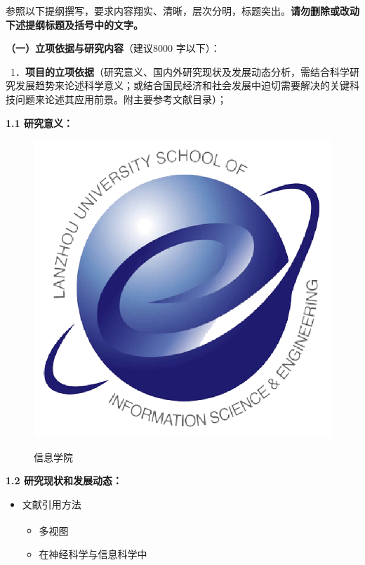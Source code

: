 \documentclass[UTF8,A4]{ctexart}
\newcommand{\upcite}[1]{\textsuperscript{\cite{#1}}}
\newcommand{\blue}{\textcolor[rgb]{0.00,0.44,0.75}}
\begin{document}
\pagestyle{empty}
\begin{center}
\end{center}
\begin{spacing}{1.6}
\kaishu
参照以下提纲撰写，要求内容翔实、清晰，层次分明，标题突出。\blue{\textbf{请勿删除或改动下述提纲标题及括号中的文字。}}

\blue{\textbf{（一）立项依据与研究内容}（建议8000 字以下）：}

\blue{~1．\textbf{项目的立项依据}（研究意义、国内外研究现状及发展动态分析，需结合科学研究发展趋势来论述科学意义；或结合国民经济和社会发展中迫切需要解决的关键科技问题来论述其应用前景。附主要参考文献目录）；}
\end{spacing}


\noindent\textbf{1.1 研究意义：}
\begin{figure}
\centering
\includegraphics[width=1\textwidth]{./images/ise.png}\\
\caption{信息学院}
\end{figure}



\noindent\textbf{1.2 研究现状和发展动态：}

\begin{itemize}
  \item 文献引用方法
  \begin{itemize}
\item 多视图\upcite{Zhan8052206}
\item 在神经科学与信息科学中\cite{Zhan8052206}
  \end{itemize}
\end{itemize}
\end{document}

